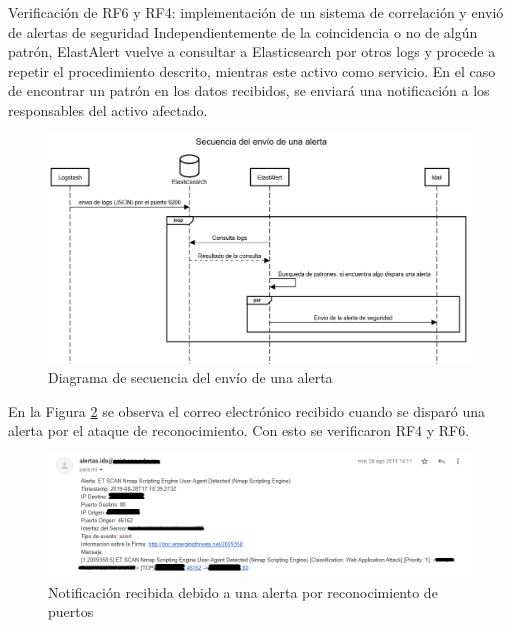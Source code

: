 \begin{section}{Verificación de RF6 y RF4: implementación de un sistema de correlación y envió de alertas de seguridad}
    Independientemente de la coincidencia o no de algún patrón, ElastAlert vuelve a consultar a Elasticsearch por otros logs y procede a repetir el procedimiento descrito, mientras este activo como servicio. En el caso de encontrar un patrón en los datos recibidos, se enviará una notificación a los responsables del activo afectado.\par
    \begin{figure}[H]
    \centering       \includegraphics[width=1\textwidth]{./iteracion_2_imagenes/2-diagrama-de-secuencia-envio-alerta.png}
    \caption{Diagrama de secuencia del envío de una alerta}
    \label{fig:iter2_diagrama_envio_alertas}
    \end{figure}
    En la Figura \ref{fig:iter2_notificacion_alertas} se observa el correo electrónico recibido cuando se disparó una alerta por el ataque de reconocimiento. Con esto se verificaron RF4 y RF6.\par
    \begin{figure}[H]
    \centering       \includegraphics[width=1\textwidth]{./iteracion_2_imagenes/notificacion_alertas_1EDITADO.png}
    \caption{Notificación recibida debido a una alerta por reconocimiento de puertos}
    \label{fig:iter2_notificacion_alertas}
    \end{figure}
    
    \end{section}